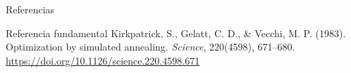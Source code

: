 \documentclass[aspectratio=169,xcolor=dvipsnames]{beamer}
\begin{document}
\begin{frame}{Referencias}

    \begin{exampleblock}{Referencia fundamental}
        Kirkpatrick, S., Gelatt, C. D., \& Vecchi, M. P. (1983). Optimization by simulated annealing. \textit{Science}, 220(4598), 671--680.
        \url{https://doi.org/10.1126/science.220.4598.671}
    \end{exampleblock}
\end{frame}
\end{document}
